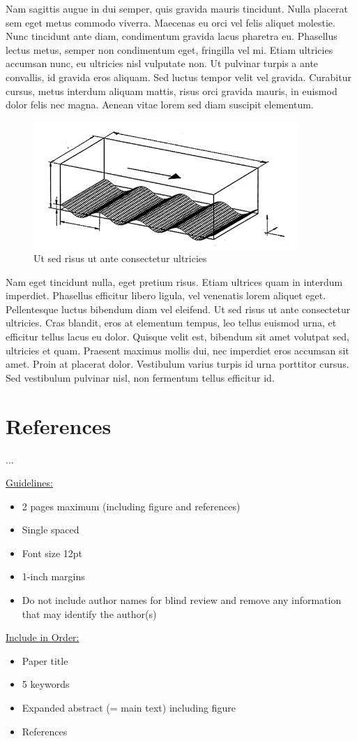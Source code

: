 \documentclass[a4paper,12pt]{article}
\begin{document}
Nam sagittis augue in dui semper, quis gravida mauris tincidunt. Nulla placerat sem eget metus commodo viverra. Maecenas eu orci vel felis aliquet molestie. Nunc tincidunt ante diam, condimentum gravida lacus pharetra eu. Phasellus lectus metus, semper non condimentum eget, fringilla vel mi. Etiam ultricies accumsan nunc, eu ultricies nisl vulputate non. Ut pulvinar turpis a ante convallis, id gravida eros aliquam. Sed luctus tempor velit vel gravida. Curabitur cursus, metus interdum aliquam mattis, risus orci gravida mauris, in euismod dolor felis nec magna. Aenean vitae lorem sed diam suscipit elementum.


\begin{figure}[htp]
\centering
\includegraphics[width=10cm]{figuexample.png}
\caption{Ut sed risus ut ante consectetur ultricies}
\label{fig:image}
\end{figure}

Nam eget tincidunt nulla, eget pretium risus. Etiam ultrices quam in interdum imperdiet. Phasellus efficitur libero ligula, vel venenatis lorem aliquet eget. Pellentesque luctus bibendum diam vel eleifend. Ut sed risus ut ante consectetur ultricies. Cras blandit, eros at elementum tempus, leo tellus euismod urna, et efficitur tellus lacus eu dolor. Quisque velit est, bibendum sit amet volutpat sed, ultricies et quam. Praesent maximus mollis dui, nec imperdiet eros accumsan sit amet. Proin at placerat dolor. Vestibulum varius turpis id urna porttitor cursus. Sed vestibulum pulvinar nisl, non fermentum tellus efficitur id.

\section*{References}
...

\vskip 40pt
\underline {Guidelines:}
\begin{itemize}
\itemsep0pt
  \item 2 pages maximum (including figure and references)
  \item Single spaced
  \item Font size 12pt
  \item 1-inch margins
  \item Do not include author names for blind review and remove any information that may identify the author(s)
\end{itemize}

\underline {Include in Order:}
\begin{itemize}
\itemsep0pt
  \item Paper title
  \item 5 keywords
  \item Expanded abstract (= main text)  including figure
  \item References
\end{itemize}
\end{document}
